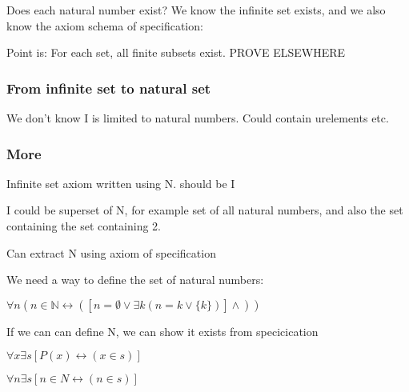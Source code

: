 Does each natural number exist? We know the infinite set exists, and we also know the axiom schema of specification:

Point is: For each set, all finite subsets exist. PROVE ELSEWHERE

\subsubsection{From infinite set to natural set}

We don’t know I is limited to natural numbers. Could contain urelements etc.

\subsubsection{More}

Infinite set axiom written using N. should be I


I could be superset of N, for example set of all natural numbers, and also the set containing the set containing 2.

Can extract N using axiom of specification

We need a way to define the set of natural numbers:

\(\forall n (n\in \mathbb{N}\leftrightarrow ([n=\emptyset \lor \exists k (n=k\lor \{k\})]\land ))\)

If we can can define N, we can show it exists from specicication

\(\forall x \exists s [P(x)\leftrightarrow (x\in s)]\)

\(\forall n \exists s [n\in N \leftrightarrow (n\in s)]\)

